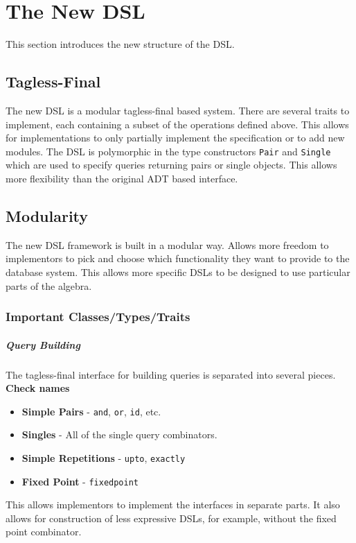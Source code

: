 \documentclass{report}
\newcommand \2[0]{\textbf{2}}
\newcommand \3[0]{\textbf{3}}
\newcommand{\todo}[1]{\textbf{#1}}
\begin{document}
\chapter{The New DSL}
This section introduces the new structure of the DSL.
 
\section{Tagless-Final}
The new DSL is a modular tagless-final based system. There are several traits to implement, each containing a subset of the operations defined above. This allows for implementations to only partially implement the specification or to add new modules.
The DSL is polymorphic in the type constructors \texttt{Pair} and \texttt{Single} which are used to specify queries returning pairs or single objects. This allows more flexibility than the original ADT based interface.

\section{Modularity}
The new DSL framework is built in a modular way. 
Allows more freedom to implementors to pick and choose which functionality they want to provide to the database system. This allows more specific DSLs to be designed to use particular parts of the algebra.
\subsection{Important Classes/Types/Traits}
\paragraph{Query Building}
The tagless-final interface for building queries is separated into several pieces.
\todo{Check names}
\begin{itemize}
    \item \textbf{Simple Pairs} - \texttt{and}, \texttt{or}, \texttt{id}, etc.
    \item \textbf{Singles} - All of the single query combinators.
    \item \textbf{Simple Repetitions} - \texttt{upto}, \texttt{exactly}
    \item \textbf{Fixed Point} - \texttt{fixedpoint}
\end{itemize}

This allows implementors to implement the interfaces in separate parts. It also allows for construction of less expressive DSLs, for example, without the fixed point combinator.
\end{document}
